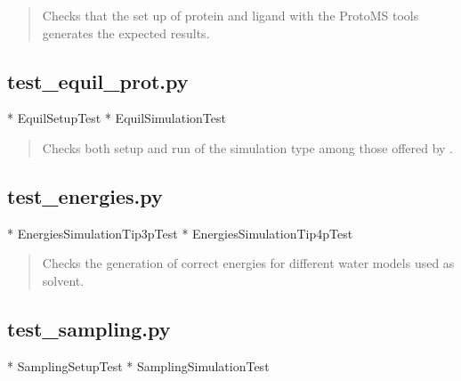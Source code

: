 \documentclass[letterpaper,10pt,english]{sphinxmanual}
\begin{document}
\begin{quote}

Checks that the set up of protein and ligand with the ProtoMS tools generates the expected results.
\end{quote}

\begin{quote}

\end{quote}


\subsection{test\_equil\_prot.py}
\label{\detokenize{testsuite:test-equil-prot-py}}
* EquilSetupTest
* EquilSimulationTest

\begin{quote}

Checks both setup and run of the  simulation type among those offered by .
\end{quote}

\begin{quote}

\end{quote}


\subsection{test\_energies.py}
\label{\detokenize{testsuite:test-energies-py}}
* EnergiesSimulationTip3pTest
* EnergiesSimulationTip4pTest

\begin{quote}

Checks the generation of correct energies for different water models used as solvent.
\end{quote}

\begin{quote}

\end{quote}


\subsection{test\_sampling.py}
\label{\detokenize{testsuite:test-sampling-py}}
* SamplingSetupTest
* SamplingSimulationTest
\end{document}
